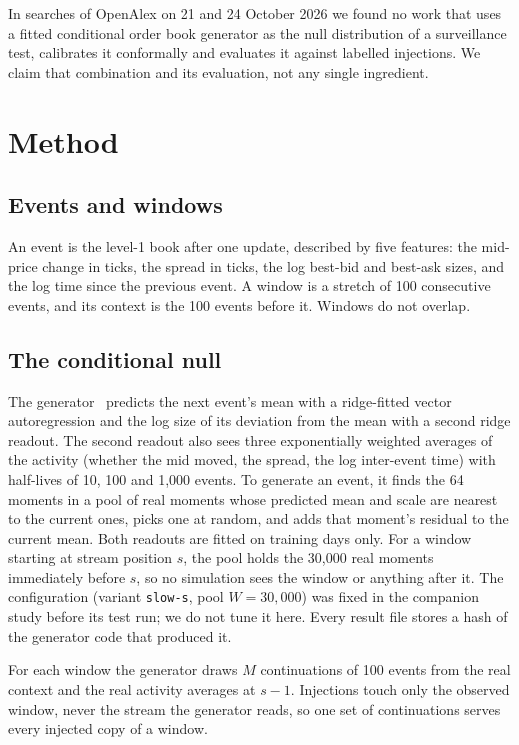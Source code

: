 \documentclass[journal]{IEEEtran}
\begin{document}
In searches of OpenAlex on 21 and 24 October 2026 we found no work that uses a fitted conditional order book
generator as the null distribution of a surveillance test, calibrates it conformally and evaluates it against
labelled injections. We claim that combination and its evaluation, not any single ingredient.

\section{Method}
\label{sec:method}

\subsection{Events and windows}
An event is the level-1 book after one update, described by five features: the mid-price change in ticks, the
spread in ticks, the log best-bid and best-ask sizes, and the log time since the previous event. A window is a
stretch of 100 consecutive events, and its context is the 100 events before it. Windows do not overlap.

\subsection{The conditional null}
The generator~\cite{khatib2026noise} predicts the next event's mean with a ridge-fitted vector autoregression and
the log size of its deviation from the mean with a second ridge readout. The second readout also sees three
exponentially weighted averages of the activity (whether the mid moved, the spread, the log inter-event time)
with half-lives of 10, 100 and 1{,}000 events. To generate an event, it finds the 64 moments in a pool of real
moments whose predicted mean and scale are nearest to the current ones, picks one at random, and adds that
moment's residual to the current mean. Both readouts are fitted on training days only. For a window starting at
stream position $s$, the pool holds the 30{,}000 real moments immediately before $s$, so no simulation sees the
window or anything after it. The configuration (variant \texttt{slow-s}, pool $W=30{,}000$) was fixed in the
companion study before its test run; we do not tune it here. Every result file stores a hash of the generator
code that produced it.

For each window the generator draws $M$ continuations of 100 events from the real context and the real activity
averages at $s-1$. Injections touch only the observed window, never the stream the generator reads, so one set
of continuations serves every injected copy of a window.
\end{document}
